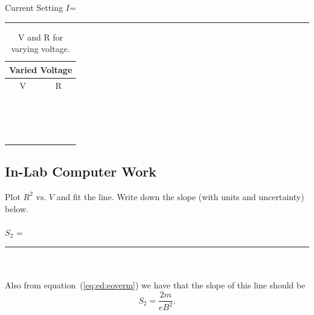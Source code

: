 \hspace{3cm} Current Setting  $I$=~\rule{3cm}{.1mm}

\begin{table}[htb]
\begin{center}
\begin{tabular}{|c|c|}
\hline
\multicolumn{2}{|c|}{Varied Voltage}\\
\hline
V & R \\
\hline
\hspace*{5cm} & \hspace*{5cm} \\
& \\
\hline       
& \\
& \\
\hline
& \\
& \\
\hline
& \\
& \\
\hline
& \\
& \\
\hline
& \\
& \\
\hline
& \\
& \\
\hline
& \\
& \\
\hline
\end{tabular}
\end{center}
\caption{V and R for varying voltage.}
\label{tab:ed:pot}
\end{table}

\subsection{In-Lab Computer Work}
Plot $R^2 \mbox{ vs. } V$ and fit the line.  
Write down the slope (with units and uncertainty) below. \\
\ \\
\hspace*{5cm} $S_2$ =~\rule{3cm}{.1mm}\\ 
\ \\
\noindent Also from equation~(\ref{eq:ed:eoverm}) we have that
the slope of this line should be
$$S_2=\frac{2m}{eB^2}.$$
 

